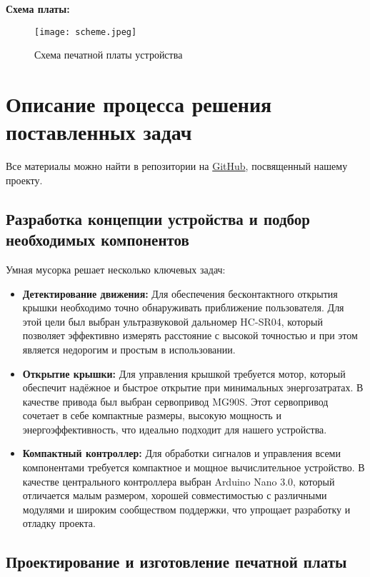 \documentclass[a4paper, 12pt]{article} %
\begin{document}
\noindent\textbf{Схема платы:}
\begin{figure}[H]
    \centering
    \texttt{[image: scheme.jpeg]}
    \caption{Схема печатной платы устройства}
\end{figure}


\section{Описание процесса решения поставленных задач}

Все материалы можно найти в репозитории на \href{https://github.com/aidenfmunro/SmartBin}{GitHub}, посвященный нашему проекту.

\subsection*{Разработка концепции устройства и подбор необходимых компонентов}

Умная мусорка решает несколько ключевых задач:

\begin{itemize}
    \item \textbf{Детектирование движения:} Для обеспечения бесконтактного открытия крышки необходимо точно обнаруживать приближение пользователя. Для этой цели был выбран ультразвуковой дальномер HC-SR04, который позволяет эффективно измерять расстояние с высокой точностью и при этом является недорогим и простым в использовании.
    \item \textbf{Открытие крышки:} Для управления крышкой требуется мотор, который обеспечит надёжное и быстрое открытие при минимальных энергозатратах. В качестве привода был выбран сервопривод MG90S. Этот сервопривод сочетает в себе компактные размеры, высокую мощность и энергоэффективность, что идеально подходит для нашего устройства.
    \item \textbf{Компактный контроллер:} Для обработки сигналов и управления всеми компонентами требуется компактное и мощное вычислительное устройство. В качестве центрального контроллера выбран Arduino Nano 3.0, который отличается малым размером, хорошей совместимостью с различными модулями и широким сообществом поддержки, что упрощает разработку и отладку проекта.
\end{itemize}

\subsection*{Проектирование и изготовление печатной платы}
\end{document}
